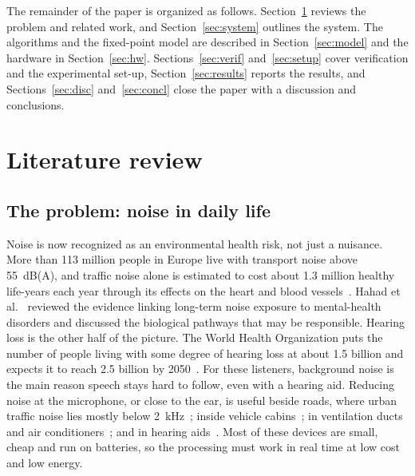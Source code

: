 The remainder of the paper is organized as follows. Section~\ref{sec:related} reviews the problem and
related work, and Section~\ref{sec:system} outlines the system. The algorithms and the fixed-point model
are described in Section~\ref{sec:model} and the hardware in Section~\ref{sec:hw}.
Sections~\ref{sec:verif} and~\ref{sec:setup} cover verification and the experimental set-up,
Section~\ref{sec:results} reports the results, and Sections~\ref{sec:disc} and~\ref{sec:concl} close the
paper with a discussion and conclusions.

\section{Literature review}\label{sec:related}
\subsection{The problem: noise in daily life}
Noise is now recognized as an environmental health risk, not just a nuisance. More than 113 million
people in Europe live with transport noise above 55~dB(A), and traffic noise alone is estimated to cost
about 1.3 million healthy life-years each year through its effects on the heart and blood
vessels~\cite{munzel2025}. Hahad et al.~\cite{hahad2025} reviewed the evidence linking long-term noise
exposure to mental-health disorders and discussed the biological pathways that may be responsible.
Hearing loss is the other half of the picture. The World Health Organization puts the number of people
living with some degree of hearing loss at about 1.5 billion and expects it to reach 2.5 billion by
2050~\cite{chadha2021}. For these listeners, background noise is the main reason speech stays hard to
follow, even with a hearing aid. Reducing noise at the microphone, or close to the ear, is useful beside
roads, where urban traffic noise lies mostly below 2~kHz~\cite{yang2024}; inside vehicle
cabins~\cite{jiang2023,zhu2024}; in ventilation ducts and air conditioners~\cite{zhu2025}; and in hearing
aids~\cite{yin2023,husstedt2023,tetteh2026}. Most of these devices are small, cheap and run on batteries,
so the processing must work in real time at low cost and low energy.


